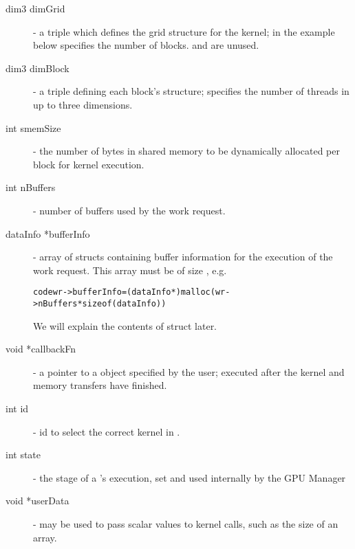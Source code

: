 \documentclass[10pt]{report}
\begin{document}
\begin{description}
\item[dim3 dimGrid]- a triple which defines the grid structure for the kernel;
in the example below  specifies the number of blocks.
 and  are unused.

\item[dim3 dimBlock]- a triple defining each block's structure;
specifies the number of threads in up to three dimensions.

\item[int smemSize]- the number of bytes in shared memory to be dynamically
allocated per block for kernel execution.

\item[int nBuffers]- number of buffers used by the work request.

\item[dataInfo *bufferInfo]- array of  structs containing buffer
information for the execution of the work request. This array must be of size , e.g.
\begin{alltt}
code{wr->bufferInfo = (dataInfo *) malloc(wr->nBuffers * sizeof(dataInfo))}
\end{alltt}
We will explain the contents of  struct later.

\item[void *callbackFn]- a pointer to a  object specified by the user;
executed after the kernel and memory transfers have finished.

\item[int id]- id to select the correct kernel in .

\item[int state]- the stage of a 's execution, set and used internally by the GPU Manager

\item[void *userData]-  may be used to pass scalar values to kernel
calls, such as the size of an array.

\end{description}
\end{document}
